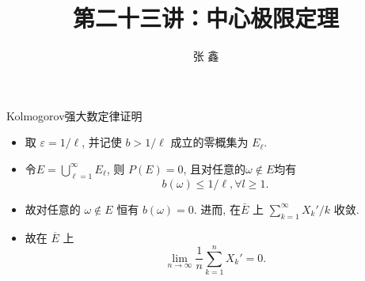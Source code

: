 \begin{frame}{Kolmogorov强大数定律证明}
	\begin{itemize}[<+-|alert@+>]

		\item 取 ${\varepsilon=1 / \ell}$, 并记使 ${b>1 / \ell}$ 成立的零概集为 $E_{\ell}$.
		\item 令$E=\bigcup_{\ell=1}^{\infty} E_{\ell}$, 则 ${P(E)=0}$, 且对任意的$\omega\notin E$均有
		\[{b(\omega) \leq 1 / \ell}, \forall l\geq 1.\]
		\item 故对任意的 $\omega \notin {E}$ 恒有 $b(\omega)=0$. 进而, 在${\bar{E}}$ 上 ${\sum_{k=1}^{\infty} X_{k}'/ k}$ 收敛.
		\item 故在 ${\overline{E}}$ 上
		\[{\lim _{n \rightarrow \infty} \dfrac{1}{n} \sum_{k=1}^{n} X_{k}'=0}.\]


	\end{itemize}

	\end{frame}











\title[概率论]{第二十三讲：中心极限定理}
\author[张鑫{\rm Email: x.zhang.seu@foxmail.com} ]{\large 张 鑫}
\date{}

{ 
	\begin{frame}
		\titlepage
	\end{frame}
}

